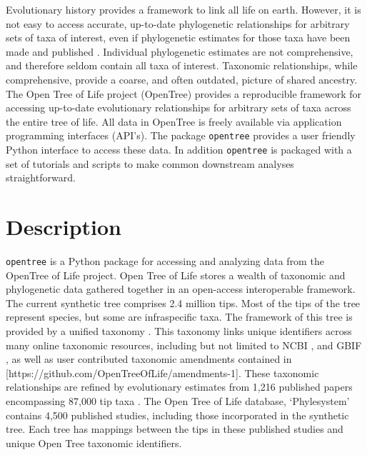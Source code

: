 \documentclass[oupdraft]{sysbio_sse}
\begin{document}
Evolutionary history provides a framework to link all life on earth. However, it is not easy to access accurate, up-to-date phylogenetic relationships for arbitrary sets of taxa of interest, even if phylogenetic estimates for those taxa have been made and published \citep{drew_lost_2013, mctavish_how_2017}. Individual phylogenetic estimates are not comprehensive, and therefore seldom contain all taxa of interest. Taxonomic relationships, while comprehensive, provide a coarse, and often outdated, picture of shared ancestry.
The Open Tree of Life project (OpenTree) provides a reproducible framework for accessing up-to-date evolutionary relationships for arbitrary sets of taxa across the entire tree of life.
All data in OpenTree is freely available via application programming interfaces (API's).
The package \texttt{opentree} provides a user friendly Python interface to access these data. In addition \texttt{opentree} is packaged with a set of tutorials and scripts to make common downstream analyses straightforward.

\bigskip
\section{Description}
\label{sec2}

\texttt{opentree} is a Python package for accessing and analyzing data from the OpenTree of Life project.
Open Tree of Life stores a wealth of taxonomic and phylogenetic data gathered together in an open-access interoperable framework.
The current synthetic tree \citep{opentreeoflife_open_2019} comprises 2.4 million tips.
Most of the tips of the tree represent species, but some are infraspecific taxa.
The framework of this tree is provided by a unified taxonomy \citep{opentreeoflife_open_2019-1, rees_automated_2017}.
This taxonomy links unique identifiers across many online taxonomic resources, including but not limited to NCBI \citep{federhen_ncbi_2012}, and GBIF \citep{gbif_secretariat_gbif_2019}, as well as user contributed taxonomic amendments contained in [https://github.com/OpenTreeOfLife/amendments-1].
These taxonomic relationships are refined by evolutionary estimates from 1,216 published papers encompassing 87,000 tip taxa \citep{opentreeoflife_open_2019, redelings_supertree_2017}.
The Open Tree of Life database, `Phylesystem' \citep{mctavish_phylesystem_2015} contains 4,500 published studies, including those incorporated in the synthetic tree. Each tree has mappings between the tips in these published studies and unique Open Tree taxonomic identifiers.
\end{document}
